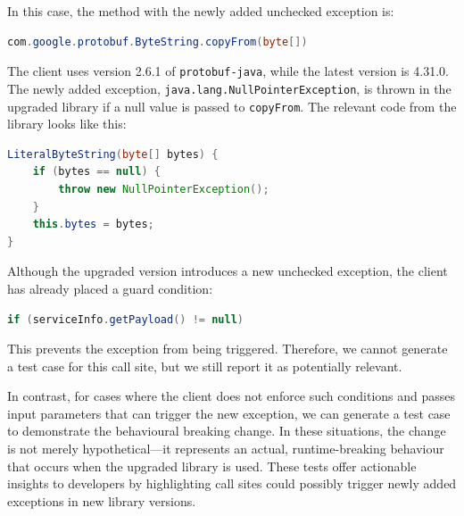 In this case, the method with the newly added unchecked exception is:

\begin{lstlisting}[language=Java, basicstyle=\scriptsize\ttfamily]
com.google.protobuf.ByteString.copyFrom(byte[])
\end{lstlisting}

The client uses version 2.6.1 of \texttt{protobuf-java}, while the latest version is 4.31.0. The newly added exception, \texttt{java.lang.NullPointerException}, is thrown in the upgraded library if a null value is passed to \texttt{copyFrom}. The relevant code from the library looks like this:

\begin{lstlisting}[language=Java, basicstyle=\scriptsize\ttfamily]
LiteralByteString(byte[] bytes) {
    if (bytes == null) {
        throw new NullPointerException();
    }
    this.bytes = bytes;
}
\end{lstlisting}

Although the upgraded version introduces a new unchecked exception, the client has already placed a guard condition:

\begin{lstlisting}[language=Java, basicstyle=\scriptsize\ttfamily]
if (serviceInfo.getPayload() != null)
\end{lstlisting}

This prevents the exception from being triggered. Therefore, we cannot generate a test case for this call site, but we still report it as potentially relevant.

In contrast, for cases where the client does not enforce such conditions and passes input parameters that can trigger the new exception, we can generate a test case to demonstrate the behavioural breaking change. In these situations, the change is not merely hypothetical—it represents an actual, runtime-breaking behaviour that occurs when the upgraded library is used. These tests offer actionable insights to developers by highlighting call sites could possibly trigger newly added exceptions in new library versions.


